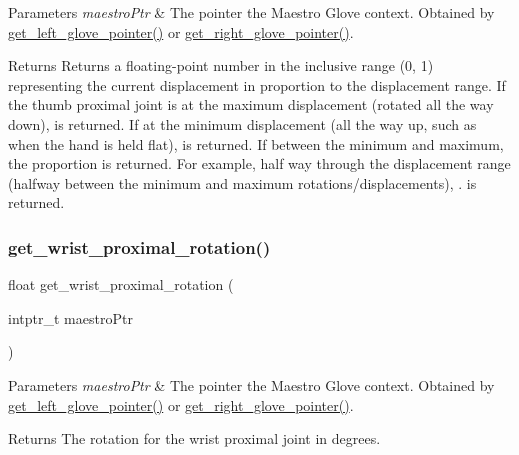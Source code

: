 \begin{DoxyParams}{Parameters}
{\em maestro\+Ptr} & The pointer the Maestro Glove context. Obtained by \hyperlink{group__glove_management_ga63ce3c99d4a8b8db851b22af9185764e}{get\+\_\+left\+\_\+glove\+\_\+pointer()} or \hyperlink{group__glove_management_ga9b8fd9d91aeac3f8da50f7a7eba0c32b}{get\+\_\+right\+\_\+glove\+\_\+pointer()}. \\
\hline
\end{DoxyParams}
\begin{DoxyReturn}{Returns}
Returns a floating-\/point number in the inclusive range {\ttfamily (0, 1)} representing the current displacement in proportion to the displacement range. If the thumb proximal joint is at the maximum displacement (rotated all the way down), {} is returned. If at the minimum displacement (all the way up, such as when the hand is held flat), {} is returned. If between the minimum and maximum, the proportion is returned. For example, half way through the displacement range (halfway between the minimum and maximum rotations/displacements), {.} is returned. 
\end{DoxyReturn}
\mbox{\label{group__rotation_access_ga155f18439d7b43c1722b035fc38a3225}} 
\subsubsection{\texorpdfstring{get\+\_\+wrist\+\_\+proximal\+\_\+rotation()}{get\_wrist\_proximal\_rotation()}}
{\footnotesize\ttfamily float get\+\_\+wrist\+\_\+proximal\+\_\+rotation (\begin{DoxyParamCaption}\item[{intptr\+\_\+t}]{maestro\+Ptr }\end{DoxyParamCaption})}


\begin{DoxyParams}{Parameters}
{\em maestro\+Ptr} & The pointer the Maestro Glove context. Obtained by \hyperlink{group__glove_management_ga63ce3c99d4a8b8db851b22af9185764e}{get\+\_\+left\+\_\+glove\+\_\+pointer()} or \hyperlink{group__glove_management_ga9b8fd9d91aeac3f8da50f7a7eba0c32b}{get\+\_\+right\+\_\+glove\+\_\+pointer()}. \\
\hline
\end{DoxyParams}
\begin{DoxyReturn}{Returns}
The rotation for the wrist proximal joint in degrees. 
\end{DoxyReturn}
